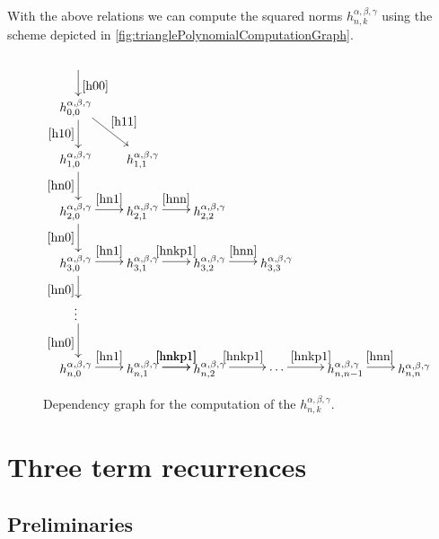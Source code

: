 \documentclass{article}
\numberwithin{equation}{section}
\numberwithin{figure}{section}
\begin{document}
With the above relations we can compute the squared norms $h^{\alpha,\beta,\gamma}_{n,k}$ using the scheme depicted in \autoref{fig:trianglePolynomialComputationGraph}.

\begin{figure}
%
\begin{equation*}
\xymatrix @-0.2pc {
\ar@<2pt>[d]^{\eqref{h00}}\\
h^{\alpha,\beta,\gamma}_{0,0} \ar@<2pt>[d]_{\eqref{h10}} \ar@<2pt>[rd]^{\eqref{h11}}\\
h^{\alpha,\beta,\gamma}_{1,0} \ar@<2pt>[d]_{\eqref{hn0}} & h^{\alpha,\beta,\gamma}_{1,1}\\
h^{\alpha,\beta,\gamma}_{2,0} \ar@<2pt>[d]_{\eqref{hn0}} \ar@<2pt>[r]^{\eqref{hn1}} & h^{\alpha,\beta,\gamma}_{2,1} \ar@<2pt>[r]^{\eqref{hnn}} & h^{\alpha,\beta,\gamma}_{2,2}\\
h^{\alpha,\beta,\gamma}_{3,0} \ar@<2pt>[d]_{\eqref{hn0}} \ar@<2pt>[r]^{\eqref{hn1}} & h^{\alpha,\beta,\gamma}_{3,1} \ar@<2pt>[r]^{\eqref{hnkp1}} & h^{\alpha,\beta,\gamma}_{3,2} \ar@<2pt>[r]^{\eqref{hnn}} & h^{\alpha,\beta,\gamma}_{3,3}\\
\vdots \ar@<2pt>[d]_{\eqref{hn0}}\\
h^{\alpha,\beta,\gamma}_{n,0} \ar@<2pt>[r]^{\eqref{hn1}} & h^{\alpha,\beta,\gamma}_{n,1} \ar@<2pt>[r]^{\eqref{hnkp1}} \ar@<2pt>[r]^{\eqref{hnkp1}} & h^{\alpha,\beta,\gamma}_{n,2} \ar@<2pt>[r]^{\eqref{hnkp1}} & \cdots \ar@<2pt>[r]^{\eqref{hnkp1}} & h^{\alpha,\beta,\gamma}_{n,n-1} \ar@<2pt>[r]^{\eqref{hnn}} & h^{\alpha,\beta,\gamma}_{n,n}
}
\end{equation*}
%
\caption{Dependency graph for the computation of the $h^{\alpha,\beta,\gamma}_{n,k}$.}
\label{fig:trianglePolynomialComputationGraph}
\end{figure}

\section{Three term recurrences}

\subsection{Preliminaries}
\end{document}
